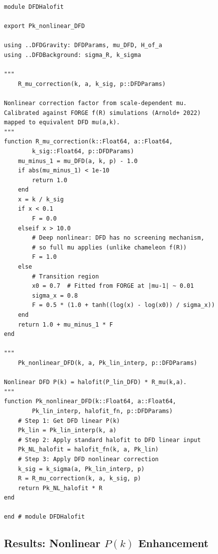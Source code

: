 \documentclass[11pt,a4paper]{article}
\begin{document}
\begin{lstlisting}[caption={DFDHalofit.jl --- Nonlinear P(k) with scale-dependent mu}]
module DFDHalofit

export Pk_nonlinear_DFD

using ..DFDGravity: DFDParams, mu_DFD, H_of_a
using ..DFDBackground: sigma_R, k_sigma

"""
    R_mu_correction(k, a, k_sig, p::DFDParams)

Nonlinear correction factor from scale-dependent mu.
Calibrated against FORGE f(R) simulations (Arnold+ 2022)
mapped to equivalent DFD mu(a,k).
"""
function R_mu_correction(k::Float64, a::Float64,
        k_sig::Float64, p::DFDParams)
    mu_minus_1 = mu_DFD(a, k, p) - 1.0
    if abs(mu_minus_1) < 1e-10
        return 1.0
    end
    x = k / k_sig
    if x < 0.1
        F = 0.0
    elseif x > 10.0
        # Deep nonlinear: DFD has no screening mechanism,
        # so full mu applies (unlike chameleon f(R))
        F = 1.0
    else
        # Transition region
        x0 = 0.7  # Fitted from FORGE at |mu-1| ~ 0.01
        sigma_x = 0.8
        F = 0.5 * (1.0 + tanh((log(x) - log(x0)) / sigma_x))
    end
    return 1.0 + mu_minus_1 * F
end

"""
    Pk_nonlinear_DFD(k, a, Pk_lin_interp, p::DFDParams)

Nonlinear DFD P(k) = halofit(P_lin_DFD) * R_mu(k,a).
"""
function Pk_nonlinear_DFD(k::Float64, a::Float64,
        Pk_lin_interp, halofit_fn, p::DFDParams)
    # Step 1: Get DFD linear P(k)
    Pk_lin = Pk_lin_interp(k, a)
    # Step 2: Apply standard halofit to DFD linear input
    Pk_NL_halofit = halofit_fn(k, a, Pk_lin)
    # Step 3: Apply DFD nonlinear correction
    k_sig = k_sigma(a, Pk_lin_interp, p)
    R = R_mu_correction(k, a, k_sig, p)
    return Pk_NL_halofit * R
end

end # module DFDHalofit
\end{lstlisting}

\subsection{Results: Nonlinear $P(k)$ Enhancement}
\end{document}

